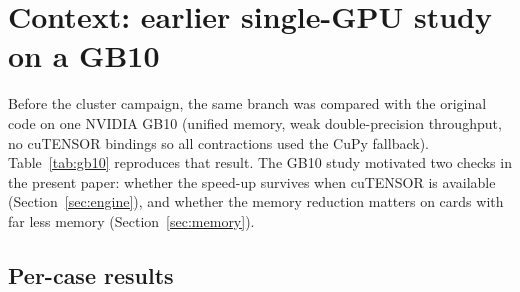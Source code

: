 \section{Context: earlier single-GPU study on a GB10}
\label{sec:gb10}

Before the cluster campaign, the same branch was compared with the original code on one NVIDIA GB10 (unified memory, weak double-precision throughput, no cuTENSOR bindings so all contractions used the CuPy fallback). Table~\ref{tab:gb10} reproduces that result. The GB10 study motivated two checks in the present paper: whether the speed-up survives when cuTENSOR is available (Section~\ref{sec:engine}), and whether the memory reduction matters on cards with far less memory (Section~\ref{sec:memory}).



\begin{landscape}
\section{Per-case results}

\end{landscape}
